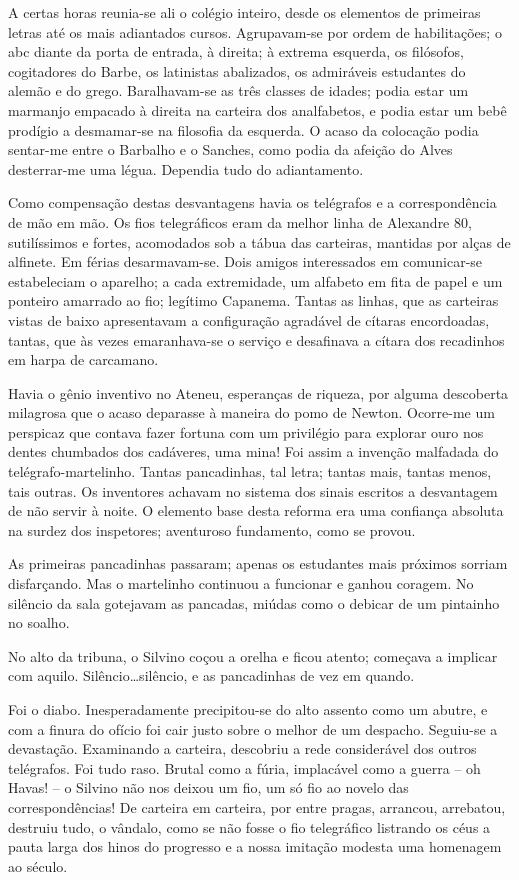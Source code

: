 A certas horas reunia{}-se
ali o colégio inteiro, desde os elementos de primeiras letras até os
mais adiantados cursos. Agrupavam{}-se por ordem de habilitações; o abc
diante da porta de entrada, à direita; à extrema esquerda, os
filósofos, cogitadores do Barbe, os latinistas abalizados, os
admiráveis estudantes do alemão e do grego. Baralhavam{}-se as três
classes de idades; podia estar um marmanjo empacado à direita na
carteira dos analfabetos, e podia estar um bebê prodígio a
desmamar{}-se na filosofia da esquerda. O acaso da colocação podia
sentar{}-me entre o Barbalho e o Sanches, como podia da afeição do
Alves desterrar{}-me uma légua. Dependia tudo do adiantamento. 

Como compensação destas desvantagens havia os telégrafos e a correspondência
de mão em mão. Os fios telegráficos eram da melhor linha de Alexandre
80, sutilíssimos e fortes, acomodados sob a tábua das carteiras,
mantidas por alças de alfinete. Em férias desarmavam{}-se. Dois amigos
interessados em comunicar{}-se estabeleciam o aparelho; a cada
extremidade, um alfabeto em fita de papel e um ponteiro amarrado ao
fio; legítimo Capanema. Tantas as linhas, que as carteiras vistas de
baixo apresentavam a configuração agradável de cítaras encordoadas,
tantas, que às vezes emaranhava{}-se o serviço e desafinava a cítara
dos recadinhos em harpa de carcamano. 

Havia o gênio inventivo no
Ateneu, esperanças de riqueza, por alguma descoberta milagrosa que o
acaso deparasse à maneira do pomo de Newton. Ocorre{}-me um perspicaz
que contava fazer fortuna com um privilégio para explorar ouro nos
dentes chumbados dos cadáveres, uma mina! Foi assim a invenção
malfadada do telégrafo{}-martelinho. Tantas pancadinhas, tal letra;
tantas mais, tantas menos, tais outras. Os inventores achavam no
sistema dos sinais escritos a desvantagem de não servir à noite. O
elemento base desta reforma era uma confiança absoluta na surdez dos
inspetores; aventuroso fundamento, como se provou. 

As primeiras
pancadinhas passaram; apenas os estudantes mais próximos sorriam
disfarçando. Mas o martelinho continuou a funcionar e ganhou coragem.
No silêncio da sala gotejavam as pancadas, miúdas como o debicar de um
pintainho no soalho. 

No alto da tribuna, o Silvino coçou a orelha e
ficou atento; começava a implicar com aquilo.
Silêncio\ldots silêncio, e as pancadinhas de vez em quando. 

Foi o diabo.
Inesperadamente precipitou{}-se do alto assento como um abutre, e com a
finura do ofício foi cair justo sobre o melhor de um despacho.
Seguiu{}-se a devastação. Examinando a carteira, descobriu a rede
considerável dos outros telégrafos. Foi tudo raso. Brutal como a fúria,
implacável como a guerra -- oh Havas! -- o Silvino não nos deixou um
fio, um só fio ao novelo das correspondências! De carteira em carteira,
por entre pragas, arrancou, arrebatou, destruiu tudo, o vândalo, como
se não fosse o fio telegráfico listrando os céus a pauta larga dos
hinos do progresso e a nossa imitação modesta uma homenagem ao século.

